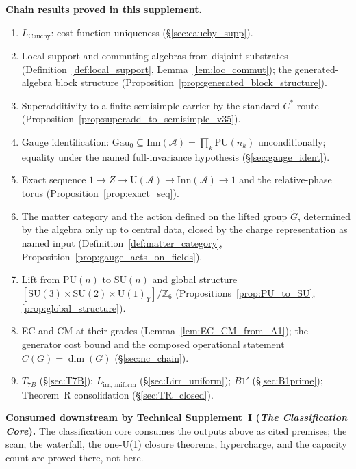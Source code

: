 \documentclass[11pt]{article}
\theoremstyle{definition}
\newcommand{\SU}{\mathrm{SU}}
\newcommand{\U}{\mathrm{U}}
\newcommand{\TSI}{Technical Supplement~I (\emph{The Classification Core})}
\begin{document}
\begin{tcolorbox}[apfbox, title={What Is Assumed, What Is Proved, What Is Deferred}]
\smallskip\noindent\textbf{Chain results proved in this supplement.}
\begin{enumerate}[nosep,label=\arabic*.,leftmargin=2em]
  \item $L_{\mathrm{Cauchy}}$: cost function uniqueness (\S\ref{sec:cauchy_supp}).
  \item Local support and commuting algebras from disjoint substrates (Definition~\ref{def:local_support}, Lemma~\ref{lem:loc_commut}); the generated-algebra block structure (Proposition~\ref{prop:generated_block_structure}).
  \item Superadditivity to a finite semisimple carrier by the standard $C^*$ route (Proposition~\ref{prop:superadd_to_semisimple_v35}).
  \item Gauge identification: $\mathrm{Gau}_0 \subseteq \mathrm{Inn}(\mathcal{A}) = \prod_k \mathrm{PU}(n_k)$ unconditionally; equality under the named full-invariance hypothesis (\S\ref{sec:gauge_ident}).
  \item Exact sequence $1 \to Z \to \mathrm{U}(\mathcal{A}) \to \mathrm{Inn}(\mathcal{A}) \to 1$ and the relative-phase torus (Proposition~\ref{prop:exact_seq}).
  \item The matter category and the action defined on the lifted group $\widetilde{G}$, determined by the algebra only up to central data, closed by the charge representation as named input (Definition~\ref{def:matter_category}, Proposition~\ref{prop:gauge_acts_on_fields}).
  \item Lift from $\mathrm{PU}(n)$ to $\SU(n)$ and global structure $[\SU(3) \times \SU(2) \times \U(1)_Y]/\mathbb{Z}_6$ (Propositions~\ref{prop:PU_to_SU}, \ref{prop:global_structure}).
  \item EC and CM at their grades (Lemma~\ref{lem:EC_CM_from_A1}); the generator cost bound and the composed operational statement $C(G) = \dim(G)$ (\S\ref{sec:nc_chain}).
  \item $T_{7B}$ (\S\ref{sec:T7B}); $L_{\mathrm{irr,uniform}}$ (\S\ref{sec:Lirr_uniform}); $B1'$ (\S\ref{sec:B1prime}); Theorem~R consolidation (\S\ref{sec:TR_closed}).
\end{enumerate}

\smallskip\noindent\textbf{Consumed downstream by \TSI.}  The
classification core consumes the outputs above as cited premises; the
scan, the waterfall, the one-U(1) closure theorems, hypercharge, and
the capacity count are proved there, not here.


\end{tcolorbox}
\end{document}
